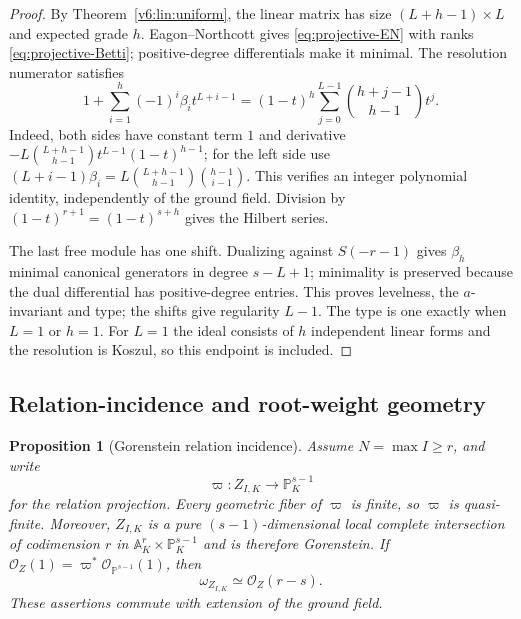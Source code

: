 \documentclass[10pt,fleqn]{article}
\numberwithin{equation}{section}
\newtheorem{proposition}[theorem]{Proposition}
\newcommand{\A}{\mathbb A}
\newcommand{\PP}{\mathbb P}
\begin{document}
\begin{proof}
By Theorem~\ref{v6:lin:uniform}, the linear matrix has size
$(L+h-1)\times L$ and expected grade $h$.
Eagon--Northcott gives \eqref{eq:projective-EN} with ranks
\eqref{eq:projective-Betti}; positive-degree differentials make it minimal.
The resolution numerator satisfies
\begin{equation}\label{eq:projective-EN-numerator}
 1+\sum_{i=1}^{h}(-1)^i\beta_i t^{L+i-1}
 =(1-t)^h\sum_{j=0}^{L-1}\binom{h+j-1}{h-1}t^j.
\end{equation}
Indeed, both sides have constant term $1$ and derivative
$-L\binom{L+h-1}{h-1}t^{L-1}(1-t)^{h-1}$; for the left side use
$(L+i-1)\beta_i=L\binom{L+h-1}{h-1}\binom{h-1}{i-1}$.
This verifies an integer polynomial identity, independently of the
ground field.  Division by $(1-t)^{r+1}=(1-t)^{s+h}$ gives the Hilbert series.

The last free module has one shift.  Dualizing against $S(-r-1)$
gives $\beta_h$ minimal canonical generators in degree $s-L+1$;
minimality is preserved because the dual differential has positive-degree
entries.  This proves levelness, the $a$-invariant and type; the shifts
give regularity $L-1$.  The type is one exactly when $L=1$ or $h=1$.
For $L=1$ the ideal consists of $h$ independent linear forms and the
resolution is Koszul, so this endpoint is included.
\end{proof}




\subsection{Relation-incidence and root-weight geometry}


\begin{proposition}[Gorenstein relation incidence]
\label{prop:relation-incidence-Gorenstein}
Assume $N=\max I\ge r$, and write
\begin{equation*}
 \varpi:Z_{I,K}\longrightarrow\PP_K^{s-1}
\end{equation*}
for the relation projection.  Every geometric fiber of $\varpi$ is finite, so $\varpi$ is
quasi-finite.  Moreover, $Z_{I,K}$ is a pure $(s-1)$-dimensional local complete intersection
of codimension $r$ in $\A_K^r\times\PP_K^{s-1}$ and is therefore Gorenstein.  If
$\mathcal O_Z(1)=\varpi^*\mathcal O_{\PP^{s-1}}(1)$, then
\begin{equation}\label{eq:relation-incidence-canonical}
 \omega_{Z_{I,K}}\simeq\mathcal O_Z(r-s).
\end{equation}
These assertions commute with extension of the ground field.
\end{proposition}
\end{document}
